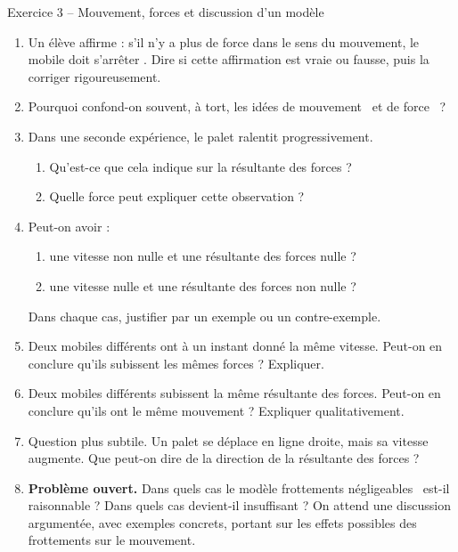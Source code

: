 \documentclass[11pt,a4paper]{article}
\begin{document}
\begin{exobox}{Exercice 3 -- Mouvement, forces et discussion d’un modèle}
\begin{enumerate}[label=\textbf{\arabic*.}]
    \item Un élève affirme : \og s’il n’y a plus de force dans le sens du mouvement, le mobile doit s’arrêter \fg.  
    Dire si cette affirmation est vraie ou fausse, puis la corriger rigoureusement.

    \item Pourquoi confond-on souvent, à tort, les idées de \og mouvement \fg\ et de \og force \fg\ ?

    \item Dans une seconde expérience, le palet ralentit progressivement.
    \begin{enumerate}[label=\alph*)]
        \item Qu’est-ce que cela indique sur la résultante des forces ?
        \item Quelle force peut expliquer cette observation ?
    \end{enumerate}

    \item Peut-on avoir :
    \begin{enumerate}[label=\alph*)]
        \item une vitesse non nulle et une résultante des forces nulle ?
        \item une vitesse nulle et une résultante des forces non nulle ?
    \end{enumerate}
    Dans chaque cas, justifier par un exemple ou un contre-exemple.

    \item Deux mobiles différents ont à un instant donné la même vitesse.  
    Peut-on en conclure qu’ils subissent les mêmes forces ? Expliquer.

    \item Deux mobiles différents subissent la même résultante des forces.  
    Peut-on en conclure qu’ils ont le même mouvement ? Expliquer qualitativement.

    \item Question plus subtile.  
    Un palet se déplace en ligne droite, mais sa vitesse augmente.  
    Que peut-on dire de la direction de la résultante des forces ?

    \item \textbf{Problème ouvert.}  
    Dans quels cas le modèle \og frottements négligeables \fg\ est-il raisonnable ?  
    Dans quels cas devient-il insuffisant ?  
    On attend une discussion argumentée, avec exemples concrets, portant sur les effets possibles des frottements sur le mouvement.
\end{enumerate}
\end{exobox}
\end{document}
